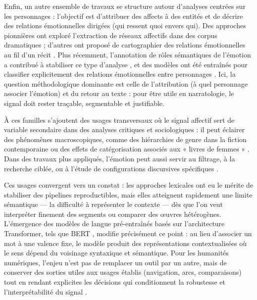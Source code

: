 \documentclass[fra, final]{anthology-ch}      %
\begin{document}
Enfin, un autre ensemble de travaux se structure autour d’analyses centrées sur les personnages : l’objectif est d’attribuer des affects à des entités et de décrire des relations émotionnelles dirigées (qui ressent quoi envers qui). Des approches pionnières ont exploré l’extraction de réseaux affectifs dans des corpus dramatiques \parencite{nalisnickbaird2013shakespeare} ; d’autres ont proposé de cartographier des relations émotionnelles au fil d’un récit \parencite{jhavarmirza2018emofiel}. Plus récemment, l’annotation de rôles sémantiques de l’émotion a contribué à stabiliser ce type d’analyse \parencite{kimklinger2018whofeelswhat}, et des modèles ont été entraînés pour classifier explicitement des relations émotionnelles entre personnages \parencite{kimklinger2019relationships}. Ici, la question méthodologique dominante est celle de l’attribution (à quel personnage associer l’émotion) et du retour au texte : pour être utile en narratologie, le signal doit rester traçable, segmentable et justifiable.

À ces familles s’ajoutent des usages transversaux où le signal affectif sert de variable secondaire dans des analyses critiques et sociologiques : il peut éclairer des phénomènes macroscopiques, comme des hiérarchies de genre dans la fiction contemporaine \parencite{kraicerpiper2019socialcharacters} ou des effets de catégorisation associés aux « livres de femmes » \parencite{koolen2018womensbooks}. Dans des travaux plus appliqués, l’émotion peut aussi servir au filtrage, à la recherche ciblée, ou à l’étude de configurations discursives spécifiques \parencite{cafiero2025riddle,zribi2026tictalk,lionnet2025makes, lionnet2026nevercare}.

Ces usages convergent vers un constat : les approches lexicales ont eu le mérite de stabiliser des pipelines reproductibles, mais elles atteignent rapidement une limite sémantique — la difficulté à représenter le contexte — dès que l’on veut interpréter finement des segments ou comparer des œuvres hétérogènes. L’émergence des modèles de langue pré-entraînés basés sur l’architecture Transformer, tels que BERT \parencite{devlin2018bert}, modifie précisément ce point : au lieu d’associer un mot à une valence fixe, le modèle produit des représentations contextualisées où le sens dépend du voisinage syntaxique et sémantique. Pour les humanités numériques, l’enjeu n’est pas de remplacer un outil par un autre, mais de conserver des sorties utiles aux usages établis (navigation, arcs, comparaisons) tout en rendant explicites les décisions qui conditionnent la robustesse et l’interprétabilité du signal \parencite{kimklinger2021survey}.
\end{document}

